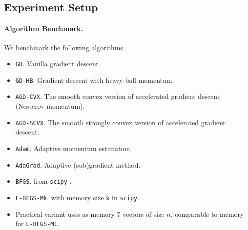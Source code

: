 \subsection{Experiment Setup}

\paragraph{Algorithm Benchmark.}
We benchmark the following algorithms.\\
\begin{itemize}[leftmargin=10pt,itemsep=2pt,topsep=0pt]
    \item \texttt{GD}. Vanilla gradient descent.
    \item \texttt{GD-HB}. Gradient descent with heavy-ball momentum. \cite{polyak1964some}
    \item \texttt{AGD-CVX}. The smooth convex version of accelerated gradient descent (Nesterov momentum). \cite{d2021acceleration}
    \item \texttt{AGD-SCVX}. The smooth strongly convex version of accelerated gradient descent. \cite{d2021acceleration}
    \item \texttt{Adam}. Adaptive momentum estimation. \cite{kingma2014adam}
    \item \texttt{AdaGrad}. Adaptive (sub)gradient method. \cite{duchi2011adaptive}
    \item \texttt{BFGS}. {\bfgs} from \texttt{scipy} \cite{nocedal1999numerical,virtanen2020scipy}.
    \item \texttt{L-BFGS-Mk}. {\lbfgs} with memory size \texttt{k} in \texttt{scipy}.
    \item Practical variant {\hdmbest} uses as memory $7$ vectors of size $n$, comparable to memory for \texttt{L-BFGS-M1}.
\end{itemize}

